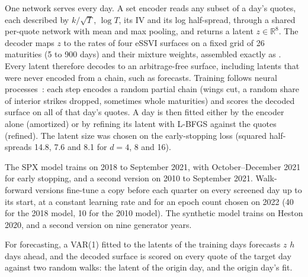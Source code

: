 One network serves every day. A set encoder reads any subset of a day's quotes, each described by
$k/\sqrt{T}$, $\log T$, its IV and its log half-spread, through a shared per-quote network with
mean and max pooling, and returns a latent $z\in\mathbb{R}^8$. The decoder maps $z$ to the rates of
four eSSVI surfaces on a fixed grid of 26 maturities (5 to 900 days) and their mixture weights,
assembled exactly as \mixfour. Every latent therefore decodes to an arbitrage-free surface,
including latents that were never encoded from a chain, such as forecasts. Training follows neural
processes~\citep{garnelo2018}: each step encodes a random partial chain (wings cut, a random share of
interior strikes dropped, sometimes whole maturities) and scores the decoded surface on all of that
day's quotes. A day is then fitted either by the encoder alone (amortized) or by refining its latent
with L-BFGS against the quotes (refined). The latent size was chosen on the early-stopping loss
(squared half-spreads 14.8, 7.6 and 8.1 for $d=4$, 8 and 16).

The SPX model trains on 2018 to September 2021, with October--December 2021 for early stopping, and
a second version on 2010 to September 2021. Walk-forward versions fine-tune a copy before each
quarter on every screened day up to its start, at a constant learning rate and for an epoch count
chosen on 2022 (40 for the 2018 model, 10 for the 2010 model). The synthetic model trains on Heston
2020, and a second version on nine generator years.

For forecasting, a VAR(1) fitted to the latents of the training days forecasts $z$ $h$ days ahead,
and the decoded surface is scored on every quote of the target day against two random walks: the
latent of the origin day, and the origin day's \mixfour{} fit.
